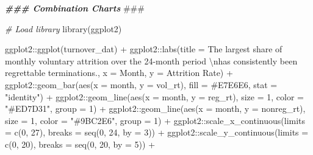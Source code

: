 \documentclass[
]{book}
\newenvironment{Shaded}{\begin{snugshade}}{\end{snugshade}}
\newcommand{\AlertTok}[1]{\textcolor[rgb]{0.94,0.16,0.16}{#1}}
\newcommand{\AttributeTok}[1]{\textcolor[rgb]{0.77,0.63,0.00}{#1}}
\newcommand{\CommentTok}[1]{\textcolor[rgb]{0.56,0.35,0.01}{\textit{#1}}}
\newcommand{\DecValTok}[1]{\textcolor[rgb]{0.00,0.00,0.81}{#1}}
\newcommand{\DocumentationTok}[1]{\textcolor[rgb]{0.56,0.35,0.01}{\textbf{\textit{#1}}}}
\newcommand{\FunctionTok}[1]{\textcolor[rgb]{0.00,0.00,0.00}{#1}}
\newcommand{\NormalTok}[1]{#1}
\newcommand{\SpecialCharTok}[1]{\textcolor[rgb]{0.00,0.00,0.00}{#1}}
\newcommand{\StringTok}[1]{\textcolor[rgb]{0.31,0.60,0.02}{#1}}
\begin{document}
\begin{Shaded}
\begin{Highlighting}[]
\DocumentationTok{\#\#\# Combination Charts }\AlertTok{\#\#\#}

\CommentTok{\# Load library}
\FunctionTok{library}\NormalTok{(ggplot2)}

\NormalTok{ggplot2}\SpecialCharTok{::}\FunctionTok{ggplot}\NormalTok{(turnover\_dat) }\SpecialCharTok{+} 
\NormalTok{ggplot2}\SpecialCharTok{::}\FunctionTok{labs}\NormalTok{(}\AttributeTok{title =} \StringTok{\textquotesingle{}The largest share of monthly voluntary attrition over the 24{-}month period }\SpecialCharTok{\textbackslash{}n}\StringTok{has consistently been regrettable terminations.\textquotesingle{}}\NormalTok{,}
              \AttributeTok{x =} \StringTok{\textquotesingle{}Month\textquotesingle{}}\NormalTok{,}
              \AttributeTok{y =} \StringTok{\textquotesingle{}Attrition Rate\textquotesingle{}}\NormalTok{) }\SpecialCharTok{+}
\NormalTok{ggplot2}\SpecialCharTok{::}\FunctionTok{geom\_bar}\NormalTok{(}\FunctionTok{aes}\NormalTok{(}\AttributeTok{x =}\NormalTok{ month, }\AttributeTok{y =}\NormalTok{ vol\_rt), }\AttributeTok{fill =} \StringTok{\textquotesingle{}\#E7E6E6\textquotesingle{}}\NormalTok{, }\AttributeTok{stat =} \StringTok{"identity"}\NormalTok{) }\SpecialCharTok{+}
\NormalTok{ggplot2}\SpecialCharTok{::}\FunctionTok{geom\_line}\NormalTok{(}\FunctionTok{aes}\NormalTok{(}\AttributeTok{x =}\NormalTok{ month, }\AttributeTok{y =}\NormalTok{ reg\_rt), }\AttributeTok{size =} \DecValTok{1}\NormalTok{, }\AttributeTok{color =} \StringTok{"\#ED7D31"}\NormalTok{, }\AttributeTok{group =} \DecValTok{1}\NormalTok{) }\SpecialCharTok{+}
\NormalTok{ggplot2}\SpecialCharTok{::}\FunctionTok{geom\_line}\NormalTok{(}\FunctionTok{aes}\NormalTok{(}\AttributeTok{x =}\NormalTok{ month, }\AttributeTok{y =}\NormalTok{ nonreg\_rt), }\AttributeTok{size =} \DecValTok{1}\NormalTok{, }\AttributeTok{color =} \StringTok{"\#9BC2E6"}\NormalTok{, }\AttributeTok{group =} \DecValTok{1}\NormalTok{) }\SpecialCharTok{+}
\NormalTok{ggplot2}\SpecialCharTok{::}\FunctionTok{scale\_x\_continuous}\NormalTok{(}\AttributeTok{limits =} \FunctionTok{c}\NormalTok{(}\DecValTok{0}\NormalTok{, }\DecValTok{27}\NormalTok{), }\AttributeTok{breaks =} \FunctionTok{seq}\NormalTok{(}\DecValTok{0}\NormalTok{, }\DecValTok{24}\NormalTok{, }\AttributeTok{by =} \DecValTok{3}\NormalTok{)) }\SpecialCharTok{+}
\NormalTok{ggplot2}\SpecialCharTok{::}\FunctionTok{scale\_y\_continuous}\NormalTok{(}\AttributeTok{limits =} \FunctionTok{c}\NormalTok{(}\DecValTok{0}\NormalTok{, }\DecValTok{20}\NormalTok{), }\AttributeTok{breaks =} \FunctionTok{seq}\NormalTok{(}\DecValTok{0}\NormalTok{, }\DecValTok{20}\NormalTok{, }\AttributeTok{by =} \DecValTok{5}\NormalTok{)) }\SpecialCharTok{+}

\end{Highlighting}
\end{Shaded}
\end{document}
